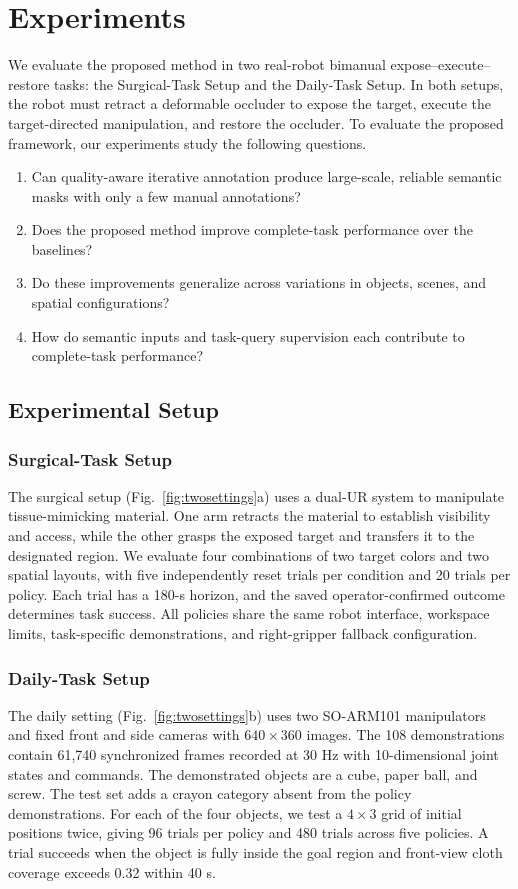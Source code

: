 \section{Experiments}
\label{sec:experiments}
We evaluate the proposed method in two real-robot bimanual expose--execute--restore tasks: the Surgical-Task Setup and the Daily-Task Setup.
In both setups, the robot must retract a deformable occluder to expose the target, 
execute the target-directed manipulation, and restore the occluder.
To evaluate the proposed framework, our experiments study the following questions.
\begin{enumerate}
    \item Can quality-aware iterative annotation produce large-scale, reliable semantic masks with only a few manual annotations?
    \item Does the proposed method improve complete-task performance over the baselines?
    \item Do these improvements generalize across variations in objects, scenes, and spatial configurations?
    \item How do semantic inputs and task-query supervision each contribute to complete-task performance?
\end{enumerate}

\subsection{Experimental Setup}
\label{sec:experimentalsetup}

\subsubsection{Surgical-Task Setup}
The surgical setup (Fig.~\ref{fig:twosettings}a) uses a dual-UR system to manipulate tissue-mimicking material.
One arm retracts the material to establish visibility and access, while the other grasps the exposed target and transfers it to the designated region.
We evaluate four combinations of two target colors and two spatial layouts, with five independently reset trials per condition and 20 trials per policy.
Each trial has a 180-s horizon, and the saved operator-confirmed outcome determines task success.
All policies share the same robot interface, workspace limits, task-specific demonstrations, and right-gripper fallback configuration.

\subsubsection{Daily-Task Setup}
The daily setting (Fig.~\ref{fig:twosettings}b) uses two SO-ARM101 manipulators and fixed front and side cameras with $640\times360$ images.
The 108 demonstrations contain 61,740 synchronized frames recorded at 30 Hz with 10-dimensional joint states and commands.
The demonstrated objects are a cube, paper ball, and screw.
The test set adds a crayon category absent from the policy demonstrations.
For each of the four objects, we test a $4\times3$ grid of initial positions twice, giving 96 trials per policy and 480 trials across five policies.
A trial succeeds when the object is fully inside the goal region and front-view cloth coverage exceeds 0.32 within 40 s.

